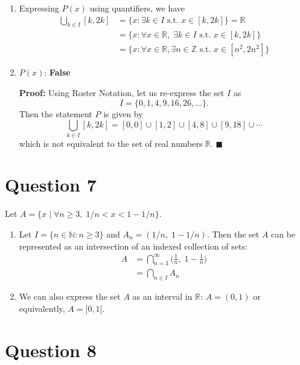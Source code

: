 \documentclass[11pt, oneside]{article}   	%
\newcommand*{\QEDA}{\hfill\ensuremath{\blacksquare}}         %
\begin{document}
\begin{enumerate}[ (a)]    
	\item Expressing $P(x)$ using quantifiers, we have
	\begin{align*}
		\bigcup_{k \in I} [k,2k] & = \{x : \exists k \in I \text{ s.t. } x \in [k, 2k] \} = \mathbb{R} \\
		& = \{x  : \forall x \in \mathbb{R}, \; \exists k \in I \text{ s.t. } x \in [k, 2k] \} \\
		& = \{x : \forall x \in \mathbb{R}, \exists n \in \mathbb{Z} \text{ s.t. } x \in [n^2, 2n^2] \}
	\end{align*}
	
	\item $P(x)$: \textbf{False}
	
	\textbf{Proof:} Using Roster Notation, let us re-express the set $I$ as
	$$I = \{0,1,4,9,16,26, \ldots \}.$$
	Then the statement $P$ is given by
	$$\bigcup_{k \in I} [k,2k] = [0,0] \cup [1,2] \cup [4,8] \cup [9,18] \cup \cdots $$
	which is not equivalent to the set of real numbers $\mathbb{R}$. \QEDA
\end{enumerate}


\section*{Question 7}

Let $A=\{x \mid \forall n \geq 3, \; 1/n < x < 1 - 1/n \}.$

\begin{enumerate}[ (a)]    

    \item Let $I=\{n \in \mathbb{N} : n \geq 3 \}$ and $A_n = (1/n, \; 1-1/n)$. Then the set $A$ can be represented as an intersection of an indexed collection of sets:
    \begin{align*}
    	A & = \bigcap_{n = 3}^{\infty} \Big(\frac{1}{n}, \; 1- \frac{1}{n}\Big) \\
	& = \bigcap_{n \in I} A_n
    \end{align*}

    
    \item We can also express the set $A$ as an interval in $\mathbb{R}$: $A = (0, 1)$ or equivalently, $A= ] 0, 1 [$.
\end{enumerate}


\section*{Question 8}
\end{document}
